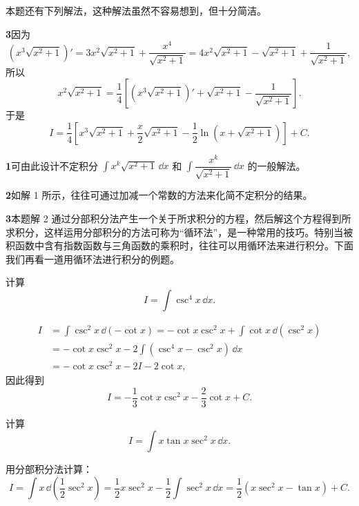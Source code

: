 本题还有下列解法，这种解法虽然不容易想到，但十分简洁。

\begin{xsolution}
\textbf{3}\quad 因为
\[
  \left(x^3\sqrt{x^2+1}\right)'
    =3x^2\sqrt{x^2+1}+\frac{x^4}{\sqrt{x^2+1}}
    =4x^2\sqrt{x^2+1}-\sqrt{x^2+1}+\frac1{\sqrt{x^2+1}},
\]
所以
\[
  x^2\sqrt{x^2+1}
    =\frac14\left[\left(x^3\sqrt{x^2+1}\right)'
      +\sqrt{x^2+1}-\frac1{\sqrt{x^2+1}}\right].
\]
于是
\[
  I=\frac14\left[x^3\sqrt{x^2+1}+\frac{x}{2}\sqrt{x^2+1}
    -\frac12\ln\left(x+\sqrt{x^2+1}\right)\right]+C.
\]
\end{xsolution}

\begin{xremark}
\textbf{1}\quad 可由此设计不定积分 $\int x^k\sqrt{x^2+1}\,\dd x$ 和 $\int\dfrac{x^k}{\sqrt{x^2+1}}\,\dd x$ 的一般解法。
\end{xremark}

\begin{xremark}
\textbf{2}\quad 如解 1 所示，往往可通过加减一个常数的方法来化简不定积分的结果。
\end{xremark}

\begin{xremark}
\textbf{3}\quad 本题解 2 通过分部积分法产生一个关于所求积分的方程，然后解这个方程得到所求积分，这样运用分部积分的方法可称为“循环法”，是一种常用的技巧。特别当被积函数中含有指数函数与三角函数的乘积时，往往可以用循环法来进行积分。下面我们再看一道用循环法进行积分的例题。
\end{xremark}

\begin{xexample}[9.1.3]
计算
\[
  I=\int\csc^4x\,\dd x.
\]
\end{xexample}

\begin{xsolution}
\begin{align*}
  I
  &=\int\csc^2x\,\dd(-\cot x)
   =-\cot x\csc^2x+\int\cot x\,\dd(\csc^2x)\\
  &=-\cot x\csc^2x-2\int(\csc^4x-\csc^2x)\,\dd x\\
  &=-\cot x\csc^2x-2I-2\cot x,
\end{align*}
因此得到
\[
  I=-\frac13\cot x\csc^2x-\frac23\cot x+C.
\]
\end{xsolution}

\begin{xexample}[9.1.4]
计算
\[
  I=\int x\tan x\sec^2x\,\dd x.
\]
\end{xexample}

\begin{xsolution}
用分部积分法计算：
\[
  I=\int x\,\dd\left(\frac12\sec^2x\right)
   =\frac12x\sec^2x-\frac12\int\sec^2x\,\dd x
   =\frac12(x\sec^2x-\tan x)+C.
\]
\end{xsolution}

